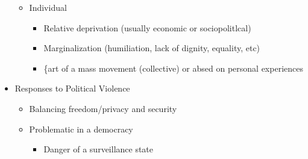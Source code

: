 \documentclass[11pt]{article}
\begin{document}
\begin{itemize}
\begin{itemize}
\begin{itemize}
\begin{itemize}
\end{itemize}
\end{itemize}
\item Individual
\begin{itemize}
\item Relative deprivation (usually economic or sociopolitlcal)
\item Marginalization (humiliation, lack of dignity, equality, etc)
\item \{art of a mass movement (collective) or absed on personal experiences
\end{itemize}
\end{itemize}
\item Responses to Political Violence
\begin{itemize}
\item Balancing freedom/privacy and security
\item Problematic in a democracy
\begin{itemize}
\item Danger of a surveillance state
\end{itemize}
\end{itemize}
\end{itemize}
\end{document}

